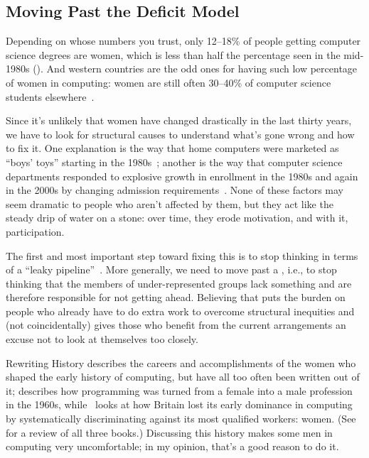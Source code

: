 \subsection*{Moving Past the Deficit Model}

Depending on whose numbers you trust,
only 12--18\% of people getting computer science degrees are women,
which is less than half the percentage seen in the mid-1980s ().
And western countries are the odd ones for having such low percentage of women in computing:
women are still often 30--40\% of computer science students elsewhere~\cite{Galp2002,Varm2015}.


Since it's unlikely that women have changed drastically in the last thirty years,
we have to look for structural causes to understand what's gone wrong and how to fix it.
One explanation is the way that home computers were marketed as ``boys' toys'' starting in the 1980s~\cite{Marg2003};
another is the way that computer science departments responded to explosive growth in enrollment
in the 1980s and again in the 2000s
by changing admission requirements~\cite{Robe2017}.
None of these factors may seem dramatic to people who aren't affected by them,
but they act like the steady drip of water on a stone:
over time, they erode motivation, and with it, participation.

The first and most important step toward fixing this is
to stop thinking in terms of a ``leaky pipeline''~\cite{Mill2015}.
More generally,
we need to move past a ,
i.e.,
to stop thinking that the members of under-represented groups lack something
and are therefore responsible for not getting ahead.
Believing that puts the burden on people who already have to do extra work to overcome structural inequities
and (not coincidentally) gives those who benefit from the current arrangements
an excuse not to look at themselves too closely.

\begin{aside}{Rewriting History}
  \cite{Abba2012} describes the careers and accomplishments of
  the women who shaped the early history of computing,
  but have all too often been written out of it;
  \cite{Ensm2003,Ensm2012} describes how programming was turned from a female into a male profession in the 1960s,
  while~\cite{Hick2018} looks at how Britain lost its early dominance in computing
  by systematically discriminating against its most qualified workers:
  women.
  (See \cite{Milt2018} for a review of all three books.)
  Discussing this history makes some men in computing very uncomfortable;
  in my opinion,
  that's a good reason to do it.
\end{aside}

